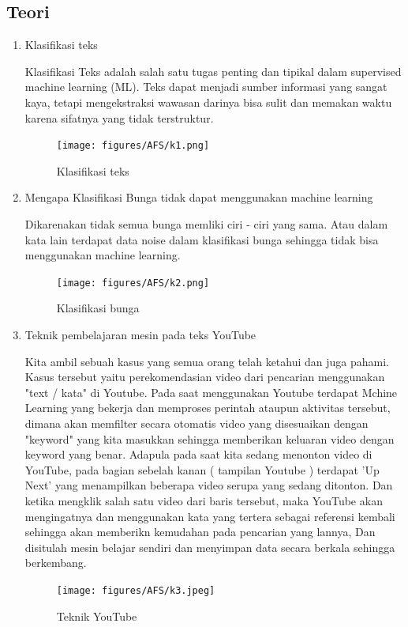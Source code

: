 \subsection{Teori}
\begin{enumerate}
\item Klasifikasi teks
	\par Klasifikasi Teks adalah salah satu tugas penting dan tipikal dalam supervised machine learning (ML). Teks dapat menjadi sumber informasi yang sangat kaya, tetapi mengekstraksi wawasan darinya bisa sulit dan memakan waktu karena sifatnya yang tidak terstruktur.
	\begin{figure}[ht]
		\centering
		\texttt{[image: figures/AFS/k1.png]}
		\caption{Klasifikasi teks}
		\label{contoh}
	\end{figure}
	
\item Mengapa Klasifikasi Bunga tidak dapat menggunakan machine learning
	\par Dikarenakan tidak semua bunga memliki ciri - ciri yang sama. Atau dalam kata lain terdapat data noise dalam klasifikasi bunga sehingga tidak bisa menggunakan machine learning.
	\begin{figure}[ht]
		\centering
		\texttt{[image: figures/AFS/k2.png]}
		\caption{Klasifikasi bunga}
		\label{contoh}
	\end{figure}

\item Teknik pembelajaran mesin pada teks YouTube
	\par Kita ambil sebuah kasus yang semua orang telah ketahui dan juga pahami. Kasus tersebut yaitu perekomendasian video dari pencarian menggunakan "text / kata" di  Youtube. Pada saat menggunakan Youtube terdapat Mchine Learning yang bekerja dan memproses perintah ataupun aktivitas tersebut, dimana akan memfilter secara otomatis video yang disesuaikan dengan "keyword" yang kita masukkan sehingga memberikan keluaran video dengan keyword yang benar. Adapula pada saat kita sedang menonton video di YouTube, pada bagian sebelah kanan ( tampilan Youtube ) terdapat 'Up Next' yang menampilkan beberapa video serupa yang sedang ditonton. Dan ketika mengklik salah satu video dari baris tersebut, maka YouTube akan mengingatnya dan menggunakan kata yang tertera sebagai referensi kembali sehingga akan memberikn kemudahan pada pencarian yang lannya, Dan disitulah mesin belajar sendiri dan menyimpan data secara berkala sehingga berkembang. 

	\begin{figure}[ht]
		\centering
		\texttt{[image: figures/AFS/k3.jpeg]}
		\caption{Teknik YouTube}
		\label{contoh}
	\end{figure}


\end{enumerate}
